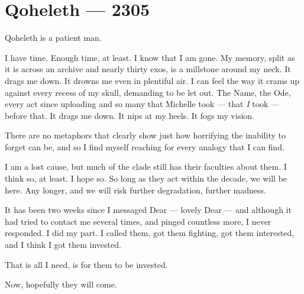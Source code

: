 \hypertarget{qoheleth-2305}{%
\chapter*{Qoheleth — 2305}\label{qoheleth-2305}}

Qoheleth is a patient man.

I have time. Enough time, at least. I know that I am gone. My memory, split as it is across an archive and nearly thirty exos, is a millstone around my neck. It drags me down. It drowns me even in plentiful air. I can feel the way it crams up against every recess of my skull, demanding to be let out. The Name, the Ode, every act since uploading and so many that Michelle took — that \emph{I} took — before that. It drags me down. It nips at my heels. It fogs my vision.

There are no metaphors that clearly show just how horrifying the inability to forget can be, and so I find myself reaching for every analogy that I can find.

I am a lost cause, but much of the clade still has their faculties about them. I think so, at least. I hope so. So long as they act within the decade, we will be here. Any longer, and we will risk further degradation, further madness.

It has been two weeks since I messaged Dear — lovely Dear — and although it had tried to contact me several times, and pinged countless more, I never responded. I did my part. I called them, got them fighting, got them interested, and I think I got them invested.

That is all I need, is for them to be invested.

Now, hopefully they will come.
